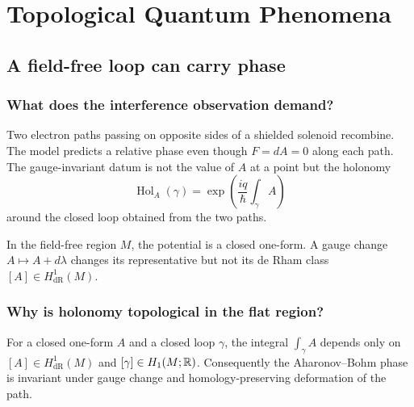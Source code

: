 \part{Topological Quantum Phenomena}

\chapter{A field-free loop can carry phase}
\label{ch:ab}



\section{What does the interference observation demand?}

Two electron paths passing on opposite sides of a shielded solenoid recombine.
The model predicts a relative phase even though $F=dA=0$ along each path.
The gauge-invariant datum is not the value of $A$ at a point but the holonomy
\[
\operatorname{Hol}_A(\gamma)
=\exp\!\left(\frac{iq}{\hbar}\int_\gamma A\right)
\]
around the closed loop obtained from the two paths.

In the field-free region $M$, the potential is a closed one-form.  A gauge
change $A\mapsto A+d\lambda$ changes its representative but not its de Rham
class $[A]\in H^1_{\mathrm{dR}}(M)$.

\section{Why is holonomy topological in the flat region?}

\begin{theorem}
For a closed one-form $A$ and a closed loop $\gamma$, the integral
$\int_\gamma A$ depends only on $[A]\in H^1_{\mathrm{dR}}(M)$ and
$[\gamma]\in H_1(M;\mathbb R)$.  Consequently the Aharonov--Bohm phase is invariant
under gauge change and homology-preserving deformation of the path.
\end{theorem}

